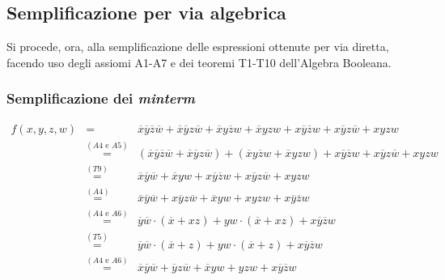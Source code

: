 \documentclass[a4paper]{extarticle}
\begin{document}
\vspace{1em}
\subsection{Semplificazione per via algebrica}
\label{sec:semplificazione_algebrica}
Si procede, ora, alla semplificazione delle espressioni ottenute per via diretta, facendo uso degli assiomi A1-A7 e dei teoremi T1-T10 dell’Algebra Booleana.

\vspace{1em}
\subsubsection{Semplificazione dei \emph{minterm}}
\begin{eqnarray*}
  f(x,y,z,w) &=& \overline{x}\overline{y}\overline{z}\overline{w} + \overline{x}\overline{y}z\overline{w} + \overline{x}y\overline{z}w + \overline{x}yzw + x\overline{y}\overline{z}w + x\overline{y}z\overline{w} + xyzw\\
  &\overset{\left(A4 \text{ e } A5\right)}{=}& \left(\overline{x}\overline{y}\overline{z}\overline{w} + \overline{x}\overline{y}z\overline{w}\right) + \left(\overline{x}y\overline{z}w + \overline{x}yzw\right) + x\overline{y}\overline{z}w + x\overline{y}z\overline{w} + xyzw\\
  &\overset{\left(T9\right)}{=}& \overline{x}\overline{y}\overline{w} + \overline{x}yw + x\overline{y}\overline{z}w + x\overline{y}z\overline{w} + xyzw\\
  &\overset{\left(A4\right)}{=}& \overline{x}\overline{y}\overline{w} + x\overline{y}z\overline{w} + \overline{x}yw + xyzw + x\overline{y}\overline{z}w\\
  &\overset{\left(A4 \text{ e } A6\right)}{=}& \overline{y}\overline{w} \cdot \left(\overline{x} + xz\right) + yw \cdot \left(\overline{x} + xz\right) + x\overline{y}\overline{z}w\\
  &\overset{\left(T5\right)}{=}& \overline{y}\overline{w} \cdot \left(\overline{x} + z\right) + yw \cdot \left(\overline{x} + z\right) + x\overline{y}\overline{z}w\\
  &\overset{\left(A4 \text{ e } A6\right)}{=}& \overline{x}\overline{y}\overline{w} + \overline{y}z\overline{w} + \overline{x}yw + yzw + x\overline{y}\overline{z}w\\
\end{eqnarray*}

\vspace{1em}
\end{document}
